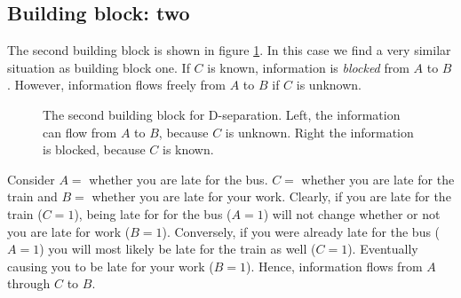 \subsection{Building block: two}
The second building block is shown in figure \ref{fig:building_block_two}.
In this case we find a very similar situation as building block one.
If $C$ is known, information is \textit{blocked} from $A$ to $B$.
However, information flows freely from $A$ to $B$ if $C$ is unknown.

\begin{figure}[h!]
\centering
\begin{minipage}{0.4\textwidth}
\end{minipage}
\begin{minipage}{0.4\textwidth}
\end{minipage}
\caption{The second building block for D-separation. 
Left, the information can flow from $A$ to $B$, because $C$
is unknown. Right the 
information is blocked, because $C$
is known.}
\label{fig:building_block_two}
\end{figure}
\begin{exmp}
Consider $A=$ whether you are late for the bus. $C =$ whether you are 
late for the train and $B = $ whether you are late for your work. 
Clearly, if you are late for the train ($C = 1$), being late for
for the bus ($A=1$) will not change whether or not you are late
for work ($B = 1$). Conversely, if you were already late for the bus
($A = 1$) you will most likely be late for the train as well ($C=1$).
Eventually causing you to be late for your work ($B =1$). Hence,
information flows from $A$ through $C$ to $B$.
\end{exmp}

\noindent
